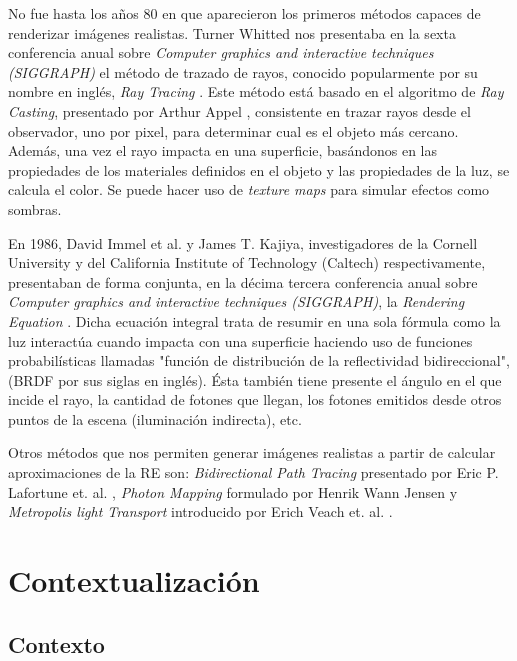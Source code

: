 \documentclass[titlepage,12pt]{report}
\begin{document}
No fue hasta los años 80 en que aparecieron los primeros métodos capaces de renderizar imágenes realistas. Turner Whitted nos presentaba en la sexta conferencia anual sobre \textit{Computer graphics and interactive techniques (SIGGRAPH)} el método de trazado de rayos, conocido popularmente por su nombre en inglés, \textit{Ray Tracing} \cite{Whitted1980}. Este método está basado en el algoritmo de \textit{Ray Casting}, presentado por Arthur Appel \cite{Appel1968}, consistente en trazar rayos desde el observador, uno por pixel, para determinar cual es el objeto más cercano. Además, una vez el rayo impacta en una superficie, basándonos en las propiedades de los materiales definidos en el objeto y las propiedades de la luz, se calcula el color. Se puede hacer uso de \textit{texture maps} para simular efectos como sombras. 

En 1986, David Immel et al. y James T. Kajiya, investigadores de la Cornell University y del California Institute of Technology (Caltech) respectivamente, presentaban de forma conjunta, en la décima tercera conferencia anual sobre \textit{Computer graphics and interactive techniques (SIGGRAPH)}, la \textit{Rendering Equation} \citep{Kajiya1986, Immel1986}. Dicha ecuación integral trata de resumir en una sola fórmula como la luz interactúa cuando impacta con una superficie haciendo uso de funciones probabilísticas llamadas "función de distribución de la reflectividad bidireccional", (BRDF por sus siglas en inglés). Ésta también tiene presente el ángulo en el que incide el rayo, la cantidad de fotones que llegan, los fotones emitidos desde otros puntos de la escena (iluminación indirecta), etc.

Otros métodos que nos permiten generar imágenes realistas a partir de calcular aproximaciones de la RE son: \textit{Bidirectional Path Tracing} presentado por Eric P. Lafortune et. al. \cite{Lafortune1993}, \textit{Photon Mapping}  formulado por Henrik Wann Jensen \cite{Jensen1996} y \textit{Metropolis light Transport} introducido por Erich Veach et. al. \cite{Veach1997}.

\section{Contextualización}

\subsection{Contexto} \label{ref:contexto}
\end{document}
